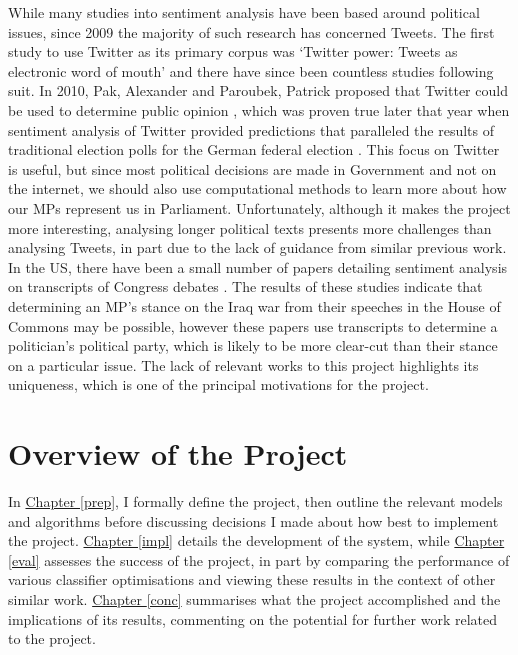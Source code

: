 \documentclass[12pt,a4paper,twoside,openright]{report}
\begin{document}
While many studies into sentiment analysis have been based around political issues, since 2009 the majority of such research has concerned Tweets. The first study to use Twitter as its primary corpus was `Twitter power: Tweets as electronic word of mouth' \cite{first_twitter} and there have since been countless studies following suit. In 2010, Pak, Alexander and Paroubek, Patrick proposed that Twitter could be used to determine public opinion \cite{twitter_as_a_corpus}, which was proven true later that year when sentiment analysis of Twitter provided predictions that paralleled the results of traditional election polls for the German federal election \cite{predicting_elections_twitter}. This focus on Twitter is useful, but since most political decisions are made in Government and not on the internet, we should also use computational methods to learn more about how our MPs represent us in Parliament. Unfortunately, although it makes the project more interesting, analysing longer political texts presents more challenges than analysing Tweets, in part due to the lack of guidance from similar previous work.
\newline
\newline
In the US, there have been a small number of papers detailing sentiment analysis on transcripts of Congress debates \cite{rep_dem_one, rep_dem_two}. The results of these studies indicate that determining an MP's stance on the Iraq war from their speeches in the House of Commons may be possible, however these papers use transcripts to determine a politician's political party, which is likely to be more clear-cut than their stance on a particular issue.
\newline
\newline
The lack of relevant works to this project highlights its uniqueness, which is one of the principal motivations for the project.

\section{Overview of the Project}
In \hyperref[prep]{Chapter \ref{prep}}, I formally define the project, then outline the relevant models and algorithms before discussing decisions I made about how best to implement the project. \hyperref[impl]{Chapter \ref{impl}} details the development of the system, while \hyperref[eval]{Chapter \ref{eval}} assesses the success of the project, in part by comparing the performance of various classifier optimisations and viewing these results in the context of other similar work. \hyperref[conc]{Chapter \ref{conc}} summarises what the project accomplished and the implications of its results, commenting on the potential for further work related to the project.
\end{document}
